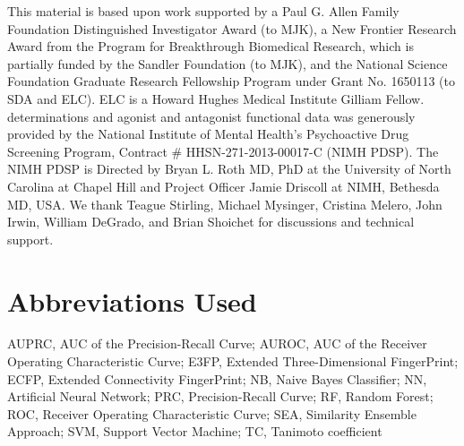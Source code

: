 \documentclass[../../main.tex]{subfiles}
\begin{document}
\begin{refsection}
	This material is based upon work supported by a Paul G.
	Allen Family Foundation Distinguished Investigator Award (to MJK), a New Frontier Research Award from the Program for Breakthrough Biomedical Research, which is partially funded by the Sandler Foundation (to MJK), and the National Science Foundation Graduate Research Fellowship Program under Grant No.
	1650113 (to SDA and ELC).
	ELC is a Howard Hughes Medical Institute Gilliam Fellow.
	\Ki{} determinations and agonist and antagonist functional data was generously provided by the National Institute of Mental Health's Psychoactive Drug Screening Program, Contract \# HHSN-271-2013-00017-C (NIMH PDSP).
	The NIMH PDSP is Directed by Bryan L.
	Roth MD, PhD at the University of North Carolina at Chapel Hill and Project Officer Jamie Driscoll at NIMH, Bethesda MD, USA.
	We thank Teague Stirling, Michael Mysinger, Cristina Melero, John Irwin, William DeGrado, and Brian Shoichet for discussions and technical support.

	\section*{Abbreviations Used}

	AUPRC, AUC of the Precision-Recall Curve; AUROC, AUC of the Receiver Operating Characteristic Curve; E3FP, Extended Three-Dimensional FingerPrint; ECFP, Extended Connectivity FingerPrint; NB, Naive Bayes Classifier; NN, Artificial Neural Network; PRC, Precision-Recall Curve; RF, Random Forest; ROC, Receiver Operating Characteristic Curve; SEA, Similarity Ensemble Approach; SVM, Support Vector Machine; TC, Tanimoto coefficient

	\clearpage
	\printbibliography[heading=subbibintoc]
\end{refsection}
\end{document}
